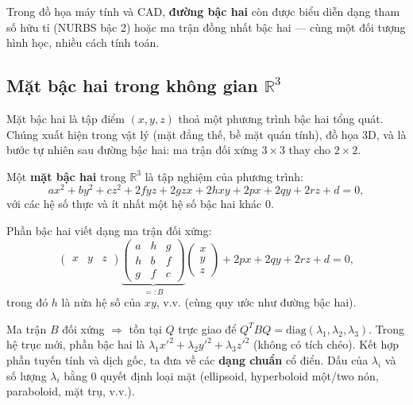 \documentclass[12pt,a4paper]{article}
\begin{document}
\begin{luuy}
Trong đồ họa máy tính và CAD, \textbf{đường bậc hai} còn được biểu diễn dạng tham số hữu tỉ (NURBS bậc 2) hoặc ma trận đồng nhất bậc hai --- cùng một đối tượng hình học, nhiều cách tính toán.
\end{luuy}

\subsection{Mặt bậc hai trong không gian $\mathbb{R}^3$}

\begin{dongco}
Mặt bậc hai là tập điểm $(x,y,z)$ thoả một phương trình bậc hai tổng quát. Chúng xuất hiện trong vật lý (mặt đẳng thế, bề mặt quán tính), đồ họa 3D, và là bước tự nhiên sau đường bậc hai: ma trận đối xứng $3 \times 3$ thay cho $2 \times 2$.
\end{dongco}

\begin{dinhnghia}
  Một \textbf{mặt bậc hai} trong $\mathbb{R}^3$ là tập nghiệm của phương trình:
  \[
    a x^2 + b y^2 + c z^2 + 2f yz + 2g zx + 2h xy + 2p x + 2q y + 2r z + d = 0,
  \]
  với các hệ số thực và ít nhất một hệ số bậc hai khác $0$.

  Phần bậc hai viết dạng ma trận đối xứng:
  \[
    \begin{pmatrix}x & y & z\end{pmatrix}
    \underbrace{\begin{pmatrix}
      a & h & g\\
      h & b & f\\
      g & f & c
    \end{pmatrix}}_{=: B}
    \begin{pmatrix}x\\ y\\ z\end{pmatrix}
    + 2p x + 2q y + 2r z + d = 0,
  \]
  trong đó $h$ là nửa hệ số của $xy$, v.v. (cùng quy ước như đường bậc hai).
\end{dinhnghia}

\begin{ynghia}[title={Phân loại và chéo hoá}]
Ma trận $B$ đối xứng $\Rightarrow$ tồn tại $Q$ trực giao để $Q^T B Q = \mathrm{diag}(\lambda_1, \lambda_2, \lambda_3)$. Trong hệ trục mới, phần bậc hai là $\lambda_1 x'^2 + \lambda_2 y'^2 + \lambda_3 z'^2$ (không có tích chéo). Kết hợp phần tuyến tính và dịch gốc, ta đưa về các \textbf{dạng chuẩn} cổ điển. Dấu của $\lambda_i$ và số lượng $\lambda_i$ bằng $0$ quyết định loại mặt (ellipsoid, hyperboloid một/two nón, paraboloid, mặt trụ, v.v.).
\end{ynghia}
\end{document}
